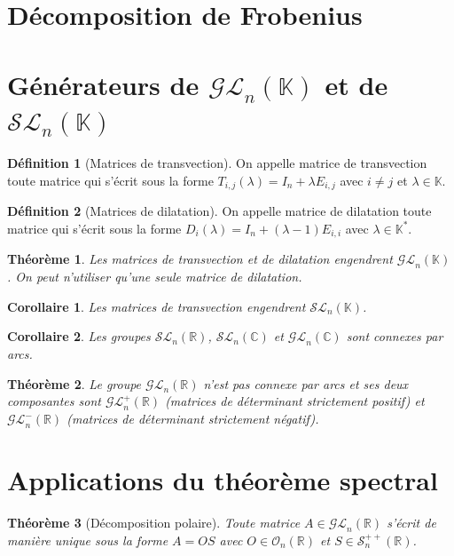 \documentclass[french]{article}
\newcommand{\R}{\mathbb{R}}
\newcommand{\C}{\mathbb{C}}
\newcommand{\K}{\mathbb{K}}
\newcommand{\st}{^*}
\theoremstyle{plain}
\newtheorem{thm}{Théorème}
\newtheorem{cor}{Corollaire}
\theoremstyle{definition}
\newtheorem{dfn}{Définition}
\begin{document}
\section{Décomposition de Frobenius}

\section{Générateurs de $\mathcal{GL}_n(\K)$ et de $\mathcal{SL}_n(\K)$}

\begin{dfn}[Matrices de transvection]
	On appelle matrice de transvection toute matrice qui s'écrit sous la forme $T_{i,j}(\lambda)=I_n+\lambda E_{i,j}$ avec $i\ne j$ et $\lambda\in\K$.
\end{dfn}

\begin{dfn}[Matrices de dilatation]
	On appelle matrice de dilatation toute matrice qui s'écrit sous la forme $D_{i}(\lambda)=I_n+(\lambda-1)E_{i,i}$ avec $\lambda\in\K\st$.
\end{dfn}

\begin{thm}
	Les matrices de transvection et de dilatation engendrent $\mathcal{GL}_n(\K)$. On peut n'utiliser qu'une seule matrice de dilatation.
\end{thm}

\begin{cor}
	Les matrices de transvection engendrent $\mathcal{SL}_n(\K)$.
\end{cor}

\begin{cor}
	Les groupes $\mathcal{SL}_n(\R)$, $\mathcal{SL}_n(\C)$ et $\mathcal{GL}_n(\C)$ sont connexes par arcs.
\end{cor}

\begin{thm}
	Le groupe $\mathcal{GL}_n(\R)$ n'est pas connexe par arcs et ses deux composantes sont $\mathcal{GL}_n^+(\R)$ (matrices de déterminant strictement positif) et $\mathcal{GL}_n^-(\R)$ (matrices de déterminant strictement négatif).
\end{thm}

\section{Applications du théorème spectral}

\begin{thm}[Décomposition polaire]
	Toute matrice $A\in\mathcal{GL}_n(\R)$ s'écrit de manière unique sous la forme $A=OS$ avec $O\in\mathcal{O}_n(\R)$ et $S\in\mathcal{S}_n^{++}(\R)$.
\end{thm}
\end{document}
